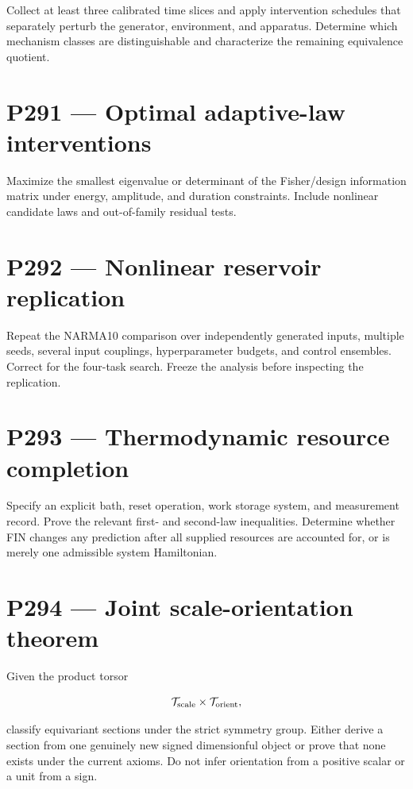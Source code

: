 \documentclass[11pt,a4paper,openany]{report}
\begin{document}
Collect at least three calibrated time slices and apply intervention schedules that separately perturb the generator, environment, and apparatus. Determine which mechanism classes are distinguishable and characterize the remaining equivalence quotient.

\section{P291 --- Optimal adaptive-law interventions}

Maximize the smallest eigenvalue or determinant of the Fisher/\allowbreak{}design information matrix under energy, amplitude, and duration constraints. Include nonlinear candidate laws and out-of-family residual tests.

\section{P292 --- Nonlinear reservoir replication}

Repeat the NARMA10 comparison over independently generated inputs, multiple seeds, several input couplings, hyperparameter budgets, and control ensembles. Correct for the four-task search. Freeze the analysis before inspecting the replication.

\section{P293 --- Thermodynamic resource completion}

Specify an explicit bath, reset operation, work storage system, and measurement record. Prove the relevant first- and second-law inequalities. Determine whether FIN changes any prediction after all supplied resources are accounted for, or is merely one admissible system Hamiltonian.

\section{P294 --- Joint scale-orientation theorem}

Given the product torsor

\[
\mathcal T_{\rm scale}\times\mathcal T_{\rm orient},
\]

classify equivariant sections under the strict symmetry group. Either derive a section from one genuinely new signed dimensionful object or prove that none exists under the current axioms. Do not infer orientation from a positive scalar or a unit from a sign.
\end{document}
